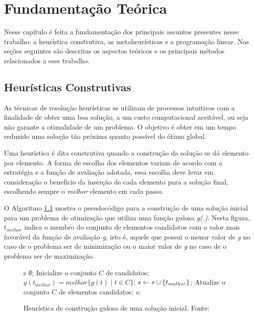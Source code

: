 \chapter{Fundamentação Teórica}

  Nesse capítulo é feita a fundamentação dos principais assuntos presentes nesse
  trabalho: a heurística construtiva, as metaheurísticas e a programação
  linear. Nas seções seguintes são descritas os aspectos teóricos e os
  principais métodos relacionados a esse trabalho.

	\section{Heurísticas Construtivas}
		As técnicas de resolução heurísticas se utilizam de processos intuitivos com a finalidade de obter uma boa solução, a um custo computacional aceitável, ou seja não garante a otimalidade de um problema. O objetivo é obter em um tempo reduzido uma solução tão próxima quanto possível do ótimo global. 
		
		Uma heurística é dita construtiva quando a construção da solução se dá elemento por elemento. A forma de escolha dos elementos variam de acordo com a estratégia e a função de avaliação adotada, essa escolha deve levar em consideração o benefício da inserção de cada elemento para a solução final, escolhendo sempre o \emph{melhor} elemento em cada passo.
		
		O Algoritmo \ref{alg:heurconsgulosa} mostra o pseudocódigo para a construção de uma solução inicial para um problema de otimização que utiliza uma função gulosa \emph{g(.)}. Nesta figura, \emph{$t_{melhor}$} indica o membro do conjunto de elementos candidatos com o valor mais favorável da função de avaliação \emph{g}, isto é, aquele que possui o menor valor de \emph{g} no caso de o problema ser de minimização ou o maior valor de \emph{g} no caso de o problema ser de maximização.


\begin{figure}[h]
\caption{Heurística de construção gulosa de uma solução inicial. \mbox{Fonte:
\cite{notasmarcone}} }\label{alg:heurconsgulosa}
\begin{programma}
\STATE s \GETS $\emptyset$;
\STATE Inicialize o conjunto $C$ de candidatos;
\STATE $g(t_{melhor}) = melhor\{g(t) \mid t \in C\}$;
\STATE $s \leftarrow s \cup \{t_{melhor}\}$;
\STATE Atualize o conjunto $C$ de elementos candidatos;
\ENDWHILE
\STATE\RETURN $s$;
\ENDALGORITHM
\end{programma}
\end{figure}		
		

